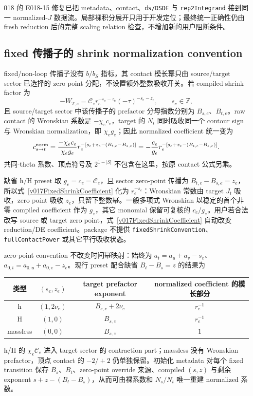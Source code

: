 ﻿\documentclass[a4paper,11pt]{article}
\begin{document}
018 的 E018-15 修复已把 metadata、contact、\texttt{ds/DSDE} 与 \texttt{rep2Integrand} 接到同一 normalized-$J$ 数据流。局部裸积分展开只用于开发定位；最终统一正确性仍由 fresh reduction 后的完整 scaling relation 检查，不增加新的用户阻断条件。

\subsection{fixed 传播子的 shrink normalization convention}

fixed/non-loop 传播子没有 $b/b_S$ 指标，其 contact 模长幂只由 source/target sector 已选择的 zero point 分配，不设置额外整数吸收开关。若 compiled shrink factor 为
\begin{equation}
 -W_{T,e}=\mathcal C_e r_e^{-s_e-z_e}(-\tau)^{-s_e-z_e},
 \qquad s_e\in\mathbb Z,
\end{equation}
且 source/target sector 中该传播子的 prefactor 分母指数分别为 $B_{s,e}$、$B_{t,e}$。raw contact 的
Wronskian 系数是 $-\chi_ec_e$，target 的 $N_t$ 同时吸收同一个 contour sign 与 Wronskian
normalization，即 $\chi_eg_e$；因此 normalized coefficient 统一变为
\begin{equation}
 c^{\rm norm}_{s\to t}
  ={-\chi_ec_e\over \chi_eg_e}r_e^{-\left[s_e+z_e-(B_{t,e}-B_{s,e})\right]}
  =-{c_e\over g_e}r_e^{-\left[s_e+z_e-(B_{t,e}-B_{s,e})\right]}.
 \label{v017FixedShrinkCoefficient}
\end{equation}
共同-theta 系数、顶点符号及 $2^{1-|S|}$ 不包含在这里，按原 contact 公式另乘。

缺省 h/H preset 取 $g_e=c_e=\mathcal C_e$，且 sector zero-point 传播为 $B_{t,e}-B_{s,e}=z_e$，所以式~\eqref{v017FixedShrinkCoefficient} 化为 $r_e^{-s_e}$：Wronskian 常数由 target $J_t$ 吸收，zero point 吸收 $z_e$，只留下整数幂。一般多项式 Wronskian 以稳定的首个非零 compiled coefficient 作为 $g_e$，其它 monomial 保留可复核的 $c_e/g_e$。用户若合法改写 source 或 target zero point，式~\eqref{v017FixedShrinkCoefficient} 自动改变 reduction/DE coefficient。package 不提供 \texttt{fixedShrinkConvention}、\texttt{fullContactPower} 或其它平行吸收状态。

zero-point convention 不改变时间幂映射：始终为 $a_t=a_u+a_v-s_e$、$a_{0,t}=a_{0,u}+a_{0,v}-z_e$。现行 preset 配合缺省 $B_t-B_s=z$ 的结果为
\begin{center}
\small
\begin{tabular}{c|c|c|c}
 类型 & $(s_e,z_e)$ & target prefactor exponent & normalized coefficient 的模长部分\\ \hline
 h & $(1,2\nu_e)$ & $B_{s,e}+2\nu_e$ & $r_e^{-1}$\\
 H & $(1,0)$ & $B_{s,e}$ & $r_e^{-1}$\\
 massless & $(0,0)$ & $B_{s,e}$ & $1$
\end{tabular}
\end{center}
h/H 的 $\chi_e\mathcal C_e$ 进入 target sector 的 contraction part；massless 没有 Wronskian prefactor，顶点 contact 的 $-2/+2$ 仍单独保留。初始化 metadata 对每个 fixed transition 保存 $B_s$、$B_t$、zero-point override 来源、compiled $(s,z)$ 与剩余 exponent $s+z-(B_t-B_s)$，从而可由裸系数和 $N_s/N_t$ 唯一重建 normalized 系数。
\end{document}
